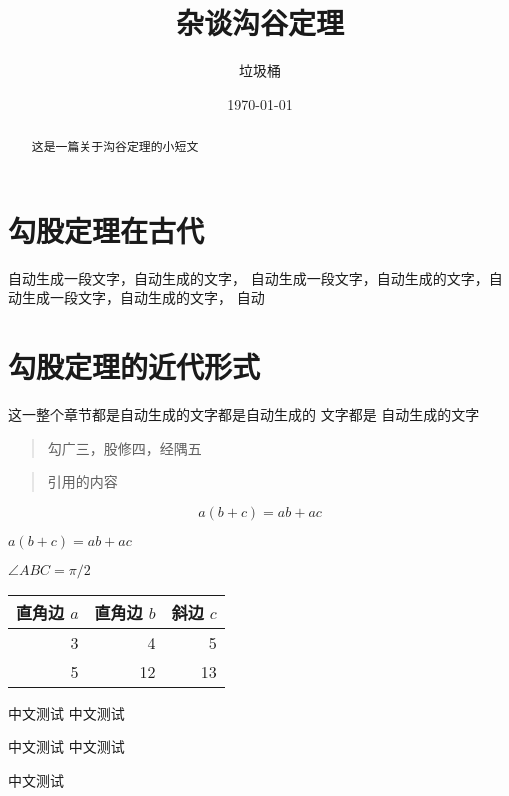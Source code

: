 \documentclass[UTF8]{ctexart}
\title{杂谈沟谷定理}
\author{垃圾桶}
\date{\today}
\begin{document}
\maketitle
\tableofcontents
\section{勾股定理在古代}
自动生成一段文字，自动生成的文字， 自动生成一段文字，自动生成的文字，自动生成一段文字，自动生成的文字， 自动
\section{勾股定理的近代形式}
这一整个章节都是自动生成的文字都是自动生成的 文字都是 自动生成的文字
\begin{quote}
勾广三，股修四，经隅五
\end{quote}

\begin{quote}
\kaishu 引用的内容
\end{quote}

\begin{abstract}
这是一篇关于沟谷定理的小短文
\end{abstract}

\begin{equation}
    a ( b + c ) = ab + ac 
\end{equation}

$ a ( b + c) = ab + ac $

$\angle ABC = \pi / 2$

\begin{tabular}{|rrr|}
    \hline
    直角边 $a$ & 直角边 $b$ & 斜边 $c$ \\
    \hline

    3 &    4 &    5 \\
    5 &    12 &   13 \\

    \hline
\end{tabular}

中文测试
中文测试

中文测试
中文测试

中文测试


\end{document}
